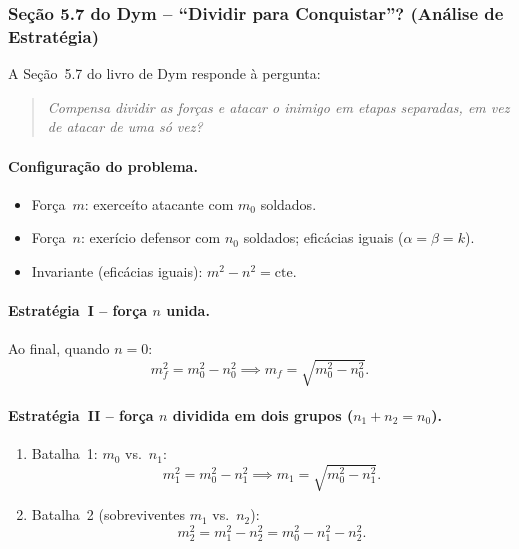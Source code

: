 \documentclass[12pt,a4paper]{article}
\theoremstyle{definition}
\begin{document}
\subsubsection*{Se\c{c}\~ao 5.7 do Dym -- ``Dividir para Conquistar''? (An\'alise de Estrat\'egia)}

A Se\c{c}\~ao~5.7 do livro de Dym responde \`a pergunta:
\begin{quote}
  \itshape Compensa dividir as for\c{c}as e atacar o inimigo em etapas separadas,
  em vez de atacar de uma s\'o vez?
\end{quote}

\paragraph{Configura\c{c}\~ao do problema.}
\begin{itemize}
  \item For\c{c}a~$m$: exerce\'ito atacante com $m_0$ soldados.
  \item For\c{c}a~$n$: exer\'icio defensor com $n_0$ soldados; efic\'acias iguais
        ($\alpha = \beta = k$).
  \item Invariante (efic\'acias iguais): $m^2 - n^2 = \text{cte.}$
\end{itemize}

\paragraph{Estrat\'egia~I -- for\c{c}a $n$ unida.}
Ao final, quando $n = 0$:
\begin{equation}
  m_f^2 = m_0^2 - n_0^2 \implies m_f = \sqrt{m_0^2 - n_0^2}.
  \label{eq:unida}
\end{equation}

\paragraph{Estrat\'egia~II -- for\c{c}a $n$ dividida em dois grupos ($n_1 + n_2 = n_0$).}
\begin{enumerate}[label=\arabic*)]
  \item Batalha~1: $m_0$ vs.\ $n_1$:
    \begin{equation}
      m_1^2 = m_0^2 - n_1^2 \implies m_1 = \sqrt{m_0^2 - n_1^2}.
    \end{equation}
  \item Batalha~2 (sobreviventes $m_1$ vs.\ $n_2$):
    \begin{equation}
      m_2^2 = m_1^2 - n_2^2 = m_0^2 - n_1^2 - n_2^2.
      \label{eq:dividida}
    \end{equation}
\end{enumerate}
\end{document}
